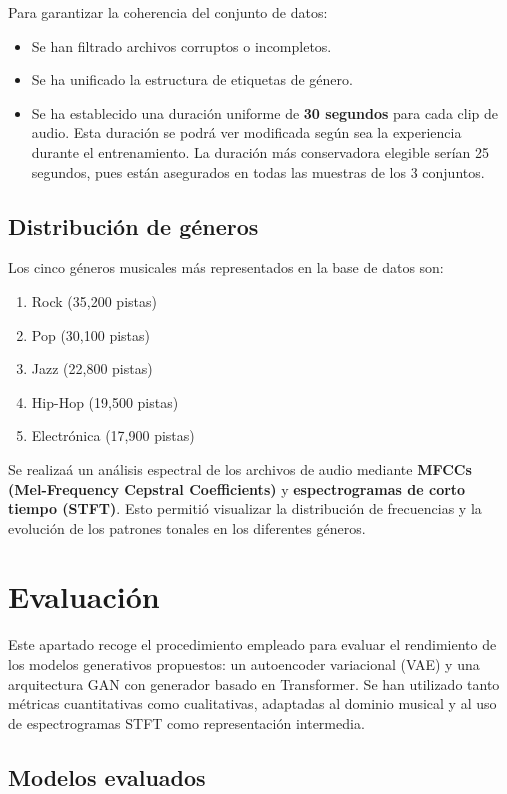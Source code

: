 Para garantizar la coherencia del conjunto de datos:
\begin{itemize}
\item Se han filtrado archivos corruptos o incompletos.
\item Se ha unificado la estructura de etiquetas de género.
\item Se ha establecido una duración uniforme de \textbf{30 segundos} para cada clip de audio. Esta duración se podrá ver modificada según sea la experiencia durante el entrenamiento. La duración más conservadora elegible serían 25 segundos, pues están asegurados en todas las muestras de los 3 conjuntos.
\end{itemize}

\subsection{Distribución de géneros}
Los cinco géneros musicales más representados en la base de datos son:
\begin{enumerate}
\item Rock (35,200 pistas)
\item Pop (30,100 pistas)
\item Jazz (22,800 pistas)
\item Hip-Hop (19,500 pistas)
\item Electrónica (17,900 pistas)
\end{enumerate}

Se realizaá un análisis espectral de los archivos de audio mediante \textbf{MFCCs (Mel-Frequency Cepstral Coefficients)} y \textbf{espectrogramas de corto tiempo (STFT)}. Esto permitió visualizar la distribución de frecuencias y la evolución de los patrones tonales en los diferentes géneros.

\section{Evaluación}

Este apartado recoge el procedimiento empleado para evaluar el rendimiento de los modelos generativos propuestos: un autoencoder variacional (VAE) y una arquitectura GAN con generador basado en Transformer. Se han utilizado tanto métricas cuantitativas como cualitativas, adaptadas al dominio musical y al uso de espectrogramas STFT como representación intermedia.

\subsection{Modelos evaluados}

